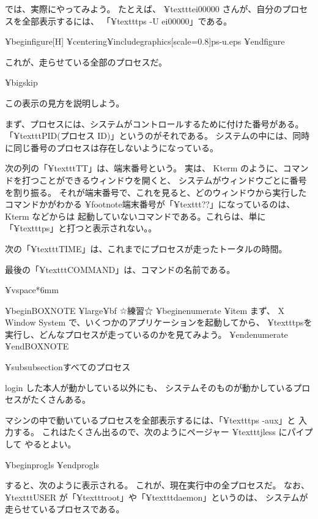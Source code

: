 では、実際にやってみよう。
たとえば、 ¥texttt{ei00000} さんが、自分のプロセスを全部表示するには、
「¥texttt{ps -U ei00000}」である。

%

¥begin{figure}[H]
¥centering{¥includegraphics[scale=0.8]{ps-u.eps}}
¥end{figure}

これが、走らせている全部のプロセスだ。

¥bigskip

この表示の見方を説明しよう。

まず、プロセスには、システムがコントロールするために付けた番号がある。
「¥texttt{PID}(プロセス ID)」というのがそれである。
システムの中には、同時に同じ番号のプロセスは存在しないようになっている。

次の列の「¥texttt{TT}」は、端末番号という。
実は、 Kterm のように、コマンドを打つことができるウィンドウを開くと、
システムがウィンドウごとに番号を割り振る。
それが端末番号で、これを見ると、どのウィンドウから実行したコマンドかがわかる
¥footnote{端末番号が「¥texttt{??}」になっているのは、 Kterm などからは
起動していないコマンドである。これらは、単に「¥texttt{ps}」と打つと表示されない。}。

次の「¥texttt{TIME}」は、これまでにプロセスが走ったトータルの時間。

最後の「¥texttt{COMMAND}」は、コマンドの名前である。

¥vspace*{6mm}

¥begin{BOXNOTE}
{¥large¥bf ☆練習☆}
¥begin{enumerate}
¥item まず、 X Window System で、いくつかのアプリケーションを起動してから、
¥texttt{ps}を実行し、どんなプロセスが走っているのかを見てみよう。
¥end{enumerate}
¥end{BOXNOTE}

¥subsubsection{すべてのプロセス}

 login した本人が動かしている以外にも、
システムそのものが動かしているプロセスがたくさんある。

マシンの中で動いているプロセスを全部表示するには、「¥texttt{ps -aux}」と
入力する。
これはたくさん出るので、次のようにページャー ¥texttt{jless} にパイプして
やるとよい。

¥begin{progls}
¥end{progls}

すると、次のように表示される。
これが、現在実行中の全プロセスだ。
なお、 ¥texttt{USER} が「¥texttt{root}」や「¥texttt{daemon}」というのは、
システムが走らせているプロセスである。

